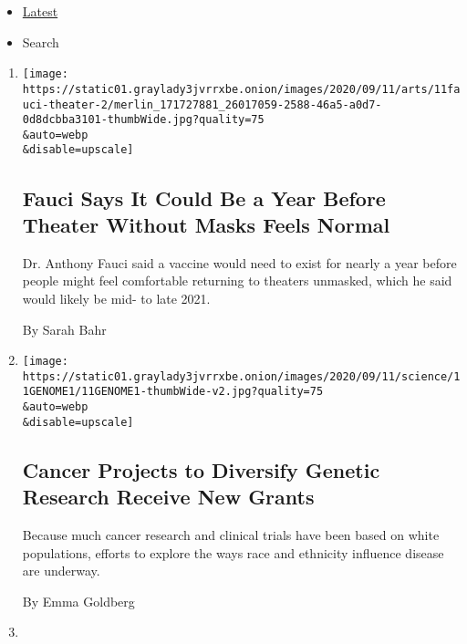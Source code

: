 \begin{itemize}
\tightlist
\item
  \protect\hyperlink{stream-panel}{Latest}
\item
  Search
\end{itemize}

\begin{enumerate}
\def\labelenumi{\arabic{enumi}.}
\item
  \href{/2020/09/11/theater/fauci-theater-reopen.html}{}

  \texttt{[image: https://static01.graylady3jvrrxbe.onion/images/2020/09/11/arts/11fauci-theater-2/merlin\_171727881\_26017059-2588-46a5-a0d7-0d8dcbba3101-thumbWide.jpg?quality=75\\\&auto=webp\\\&disable=upscale]}

  \hypertarget{fauci-says-it-could-be-a-year-before-theater-without-masks-feels-normal}{%
  \subsection{Fauci Says It Could Be a Year Before Theater Without Masks
  Feels
  Normal}\label{fauci-says-it-could-be-a-year-before-theater-without-masks-feels-normal}}

  Dr. Anthony Fauci said a vaccine would need to exist for nearly a year
  before people might feel comfortable returning to theaters unmasked,
  which he said would likely be mid- to late 2021.

  By Sarah Bahr
\item
  \href{/2020/09/11/science/genetic-cancer-research-race.html}{}

  \texttt{[image: https://static01.graylady3jvrrxbe.onion/images/2020/09/11/science/11GENOME1/11GENOME1-thumbWide-v2.jpg?quality=75\\\&auto=webp\\\&disable=upscale]}

  \hypertarget{cancer-projects-to-diversify-genetic-research-receive-new-grants}{%
  \subsection{Cancer Projects to Diversify Genetic Research Receive New
  Grants}\label{cancer-projects-to-diversify-genetic-research-receive-new-grants}}

  Because much cancer research and clinical trials have been based on
  white populations, efforts to explore the ways race and ethnicity
  influence disease are underway.

  By Emma Goldberg
\item
  \href{/2020/09/11/world/covid-19-coronavirus.html}{}


\end{enumerate}
